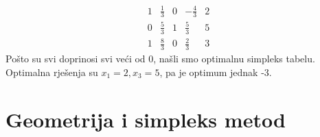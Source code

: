 \documentclass[a4paper, utf8, 11pt, colorlinks]{book}
\theoremstyle{definition}
\begin{document}
$$ \begin{array}{cccc|c}
       1   & \frac{1}{3}       & 0             &   -\frac{4}{3}             &   2  \\
       0   & \frac{5}{3}       & 1	           & \frac{5}{3}                 &   5 \\ \hline
       1   & \frac{8}{3}       & 0             &  \frac{2}{3}               &   3  
   \end{array}
 $$
Pošto su svi doprinosi svi veći od 0,  našli smo optimalnu simpleks tabelu.  Optimalna rješenja su 
 $x_1=2, x_3=5$, pa je  optimum jednak -3.
 
 \section{Geometrija i simpleks metod}
 
\end{document}
